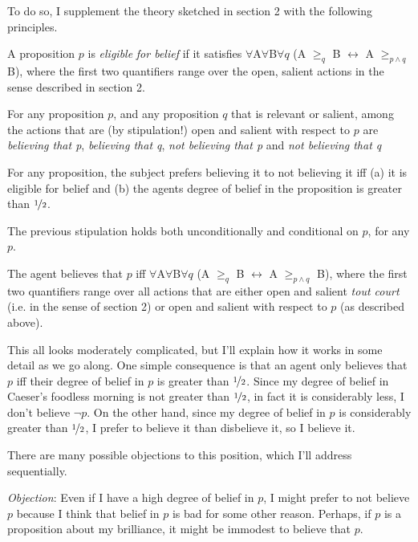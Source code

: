 To do so, I supplement the theory sketched in section 2 with the following principles.


\begin{itemize*}
\item A proposition \(p\) is \textit{eligible} \textit{for belief} if it satisfies \(\forall\)A\(\forall\)B\(\forall q\) (A \(\geq _q\) B \(\leftrightarrow\) A \(\geq _{p \wedge q}\) B), where the first two quantifiers range over the open, salient actions in the sense described in section 2.
\item For any proposition \(p\), and any proposition \(q\) that is relevant or salient, among the actions that are (by stipulation!) open and salient with respect to \(p\) are \textit{believing that p}, \textit{believing that q}, \textit{not believing that p} and \textit{not believing that q}
\item For any proposition, the subject prefers believing it to not believing it iff (a) it is eligible for belief and (b) the agents degree of belief in the proposition is greater than \(\nicefrac{1}{2}\). 
\item The previous stipulation holds both unconditionally and conditional on \(p\), for any \(p\).
\item The agent believes that \(p\) iff \(\forall\)A\(\forall\)B\(\forall q\) (A \(\geq _q\) B \(\leftrightarrow\) A \(\geq _{p \wedge q}\) B), where the first two quantifiers range over all actions that are either open and salient \textit{tout court} (i.e. in the sense of section 2) or open and salient with respect to \(p\) (as described above).
\end{itemize*}

\noindent This all looks moderately complicated, but I'll explain how it works in some detail as we go along. One simple consequence is that an agent only believes that \(p\) iff their degree of belief in \(p\) is greater than \(\nicefrac{1}{2}\). Since my degree of belief in Caeser's foodless morning is not greater than \(\nicefrac{1}{2}\), in fact it is considerably less, I don't believe \(\neg p\). On the other hand, since my degree of belief in \(p\) is considerably greater than \(\nicefrac{1}{2}\), I prefer to believe it than disbelieve it, so I believe it.

There are many possible objections to this position, which I'll address sequentially.

\medskip

\noindent \textit{Objection}: Even if I have a high degree of belief in \(p\), I might prefer to not believe \(p\) because I think that belief in \(p\) is bad for some other reason. Perhaps, if \(p\) is a proposition about my brilliance, it might be immodest to believe that \(p\).

